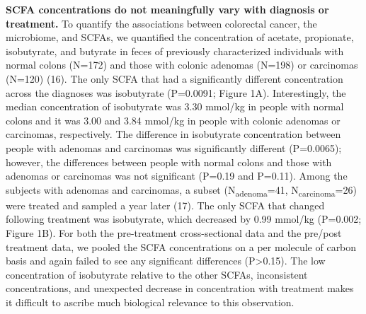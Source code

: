 \documentclass[11pt,]{article}
\begin{document}
\textbf{SCFA concentrations do not meaningfully vary with diagnosis or
treatment.} To quantify the associations between colorectal cancer, the
microbiome, and SCFAs, we quantified the concentration of acetate,
propionate, isobutyrate, and butyrate in feces of previously
characterized individuals with normal colons (N=172) and those with
colonic adenomas (N=198) or carcinomas (N=120) (16). The only SCFA that
had a significantly different concentration across the diagnoses was
isobutyrate (P=0.0091; Figure 1A). Interestingly, the median
concentration of isobutyrate was 3.30 mmol/kg in people with normal
colons and it was 3.00 and 3.84 mmol/kg in people with colonic adenomas
or carcinomas, respectively. The difference in isobutyrate concentration
between people with adenomas and carcinomas was significantly different
(P=0.0065); however, the differences between people with normal colons
and those with adenomas or carcinomas was not significant (P=0.19 and
P=0.11). Among the subjects with adenomas and carcinomas, a subset
(N\textsubscript{adenoma}=41, N\textsubscript{carcinoma}=26) were
treated and sampled a year later (17). The only SCFA that changed
following treatment was isobutyrate, which decreased by 0.99 mmol/kg
(P=0.002; Figure 1B). For both the pre-treatment cross-sectional data
and the pre/post treatment data, we pooled the SCFA concentrations on a
per molecule of carbon basis and again failed to see any significant
differences (P\textgreater{}0.15). The low concentration of isobutyrate
relative to the other SCFAs, inconsistent concentrations, and unexpected
decrease in concentration with treatment makes it difficult to ascribe
much biological relevance to this observation.
\end{document}
